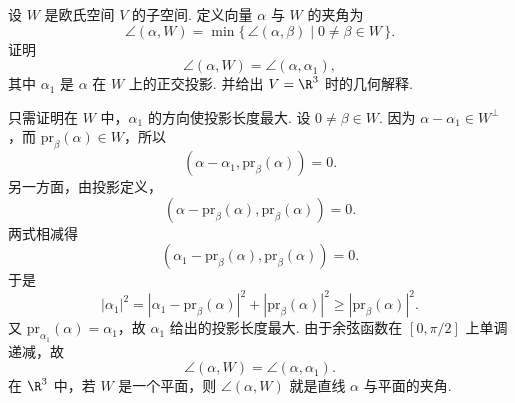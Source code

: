 \begin{problem}

	\label{p1:concept:c6-l3075}设 $W$ 是欧氏空间 $V$ 的子空间. 定义向量 $\alpha$ 与 $W$ 的夹角为
	\[
	\angle(\alpha,W)=\min\{\,\angle(\alpha,\beta)\mid 0\ne\beta\in W\,\}.
	\]
	证明
	\[
	\angle(\alpha,W)=\angle(\alpha,\alpha_1),
	\]
	其中 $\alpha_1$ 是 $\alpha$ 在 $W$ 上的正交投影. 并给出 $V=\R^3$ 时的几何解释.
\end{problem}
\begin{solution}
	只需证明在 $W$ 中，$\alpha_1$ 的方向使投影长度最大. 设 $0\ne\beta\in W$. 因为 $\alpha-\alpha_1\in W^\perp$，而 $\mathrm{pr}_{\beta}(\alpha)\in W$，所以
	\[
	(\alpha-\alpha_1,\mathrm{pr}_{\beta}(\alpha))=0.
	\]
	另一方面，由投影定义，
	\[
	(\alpha-\mathrm{pr}_{\beta}(\alpha),\mathrm{pr}_{\beta}(\alpha))=0.
	\]
	两式相减得
	\[
	(\alpha_1-\mathrm{pr}_{\beta}(\alpha),\mathrm{pr}_{\beta}(\alpha))=0.
	\]
	于是
	\[
	|\alpha_1|^2=|\alpha_1-\mathrm{pr}_{\beta}(\alpha)|^2+|\mathrm{pr}_{\beta}(\alpha)|^2
	\geqslant |\mathrm{pr}_{\beta}(\alpha)|^2.
	\]
	又 $\mathrm{pr}_{\alpha_1}(\alpha)=\alpha_1$，故 $\alpha_1$ 给出的投影长度最大. 由于余弦函数在 $[0,\pi/2]$ 上单调递减，故
	\[
	\angle(\alpha,W)=\angle(\alpha,\alpha_1).
	\]
	在 $\R^3$ 中，若 $W$ 是一个平面，则 $\angle(\alpha,W)$ 就是直线 $\alpha$ 与平面的夹角.
\end{solution}

